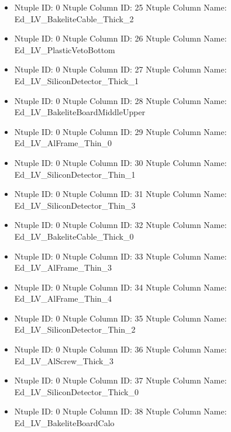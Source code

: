\documentclass[8pt]{beamer}
\begin{document}
\begin{frame}
\begin{itemize}
        \item Ntuple ID: 0 Ntuple Column ID: 25 Ntuple Column Name: Ed\_LV\_BakeliteCable\_Thick\_2
        
        \item Ntuple ID: 0 Ntuple Column ID: 26 Ntuple Column Name: Ed\_LV\_PlasticVetoBottom
        
        \item Ntuple ID: 0 Ntuple Column ID: 27 Ntuple Column Name: Ed\_LV\_SiliconDetector\_Thick\_1
        
        \item Ntuple ID: 0 Ntuple Column ID: 28 Ntuple Column Name: Ed\_LV\_BakeliteBoardMiddleUpper
        
        \item Ntuple ID: 0 Ntuple Column ID: 29 Ntuple Column Name: Ed\_LV\_AlFrame\_Thin\_0
        
        \item Ntuple ID: 0 Ntuple Column ID: 30 Ntuple Column Name: Ed\_LV\_SiliconDetector\_Thin\_1
        
        \item Ntuple ID: 0 Ntuple Column ID: 31 Ntuple Column Name: Ed\_LV\_SiliconDetector\_Thin\_3
        
        \item Ntuple ID: 0 Ntuple Column ID: 32 Ntuple Column Name: Ed\_LV\_BakeliteCable\_Thick\_0
        
        \item Ntuple ID: 0 Ntuple Column ID: 33 Ntuple Column Name: Ed\_LV\_AlFrame\_Thin\_3
        
        \item Ntuple ID: 0 Ntuple Column ID: 34 Ntuple Column Name: Ed\_LV\_AlFrame\_Thin\_4
        
        \item Ntuple ID: 0 Ntuple Column ID: 35 Ntuple Column Name: Ed\_LV\_SiliconDetector\_Thin\_2
        
        \item Ntuple ID: 0 Ntuple Column ID: 36 Ntuple Column Name: Ed\_LV\_AlScrew\_Thick\_3
        
        \item Ntuple ID: 0 Ntuple Column ID: 37 Ntuple Column Name: Ed\_LV\_SiliconDetector\_Thick\_0
        
        \item Ntuple ID: 0 Ntuple Column ID: 38 Ntuple Column Name: Ed\_LV\_BakeliteBoardCalo
        

\end{itemize}
\end{frame}
\end{document}
